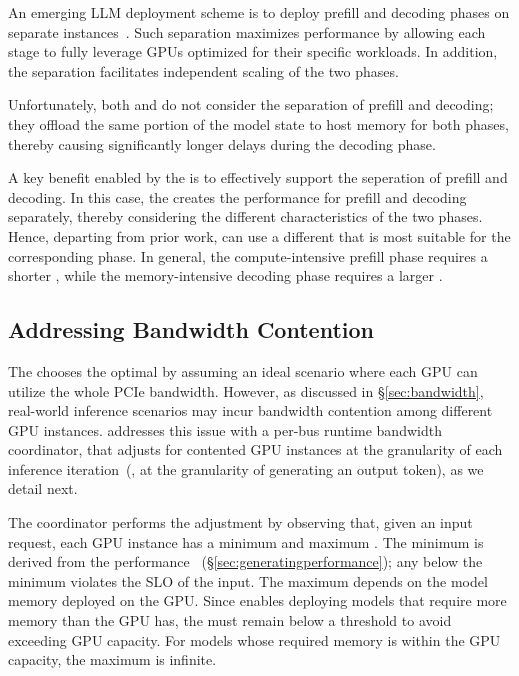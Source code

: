 %
An emerging LLM deployment scheme is to deploy prefill and decoding phases on separate instances~\cite{distserve, splitwise}. 
%
Such separation maximizes performance by allowing each stage to 
fully leverage GPUs optimized for their specific workloads. 
%
In addition, the separation facilitates independent scaling of the two phases. 

Unfortunately, both \deepspeed and \flexgen do not consider the separation
of prefill and decoding; 
%
they offload the same portion of the model state to host memory for both phases, 
thereby causing significantly longer delays during the decoding phase. 


A key benefit enabled by the \analyzer is to effectively support the seperation of prefill and decoding.   
%
In this case, the \analyzer creates the performance \record for prefill and decoding separately, thereby considering the different characteristics of the two phases. 
%
Hence, departing from prior work, \sys can use a different \interval that is most suitable for the corresponding phase. 
%
In general, the compute-intensive prefill phase requires a shorter \interval, 
while the memory-intensive decoding phase requires a larger \interval.  
%



\subsection{Addressing Bandwidth Contention}
\label{subsec:des:contention}

%
The \analyzer chooses the optimal \interval by assuming 
an ideal scenario where each GPU can utilize the whole PCIe bandwidth. 
%
However, as discussed in \S\ref{sec:bandwidth}, real-world inference scenarios may incur bandwidth contention among different GPU instances.  
%
\sys addresses this issue with a per-bus runtime bandwidth coordinator, that adjusts \interval for contented GPU instances at the granularity of each inference iteration~(\ie, at the granularity of generating an output token), as we detail next. 
%

The coordinator performs the adjustment by observing that, given an input request, each GPU instance has a minimum and maximum \interval. 
%
The minimum \interval is derived from the performance \record~(\S\ref{sec:generatingperformance}); 
%
any \interval below the minimum violates the SLO of the input.  
%
The maximum \interval depends on the model memory deployed on the GPU. 
%
Since \sys enables deploying models that require more memory than the GPU has, the 
\interval must remain below a threshold to avoid exceeding GPU capacity. 
%
For models whose required memory is within the GPU capacity, the
maximum \interval is infinite. 

